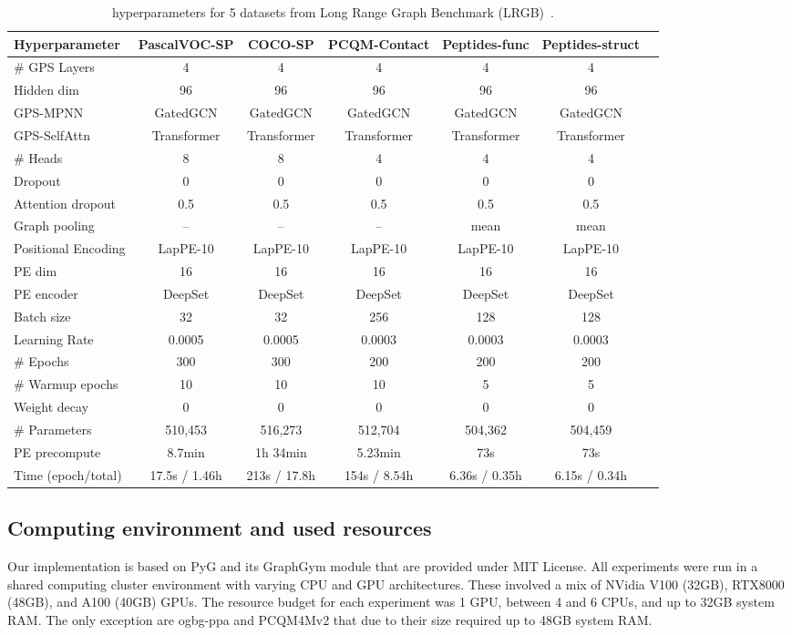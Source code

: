 \documentclass{article}
\begin{document}
\begin{table}[ht]
    \caption{\method hyperparameters for 5 datasets from Long Range Graph Benchmark (LRGB)~\cite{dwivedi2022LRGB}.}
    \label{tab:hparams_lrgb}
    \centering
\fontsize{8.5pt}{8.5pt}\selectfont
    \begin{tabular}{lcccccc}\toprule
    Hyperparameter &\textbf{PascalVOC-SP} &\textbf{COCO-SP} &\textbf{PCQM-Contact} &\textbf{Peptides-func} &\textbf{Peptides-struct} \\\midrule
    \# GPS Layers &4 &4 &4 &4 &4 \\
    Hidden dim &96 &96 &96 &96 &96 \\
    GPS-MPNN &GatedGCN &GatedGCN &GatedGCN &GatedGCN &GatedGCN \\
    GPS-SelfAttn &Transformer &Transformer &Transformer &Transformer &Transformer \\
    \# Heads &8 &8 &4 &4 &4 \\
    Dropout &0 &0 &0 &0 &0 \\
    Attention dropout &0.5 &0.5 &0.5 &0.5 &0.5 \\
    Graph pooling &-- &-- &-- &mean &mean \\\midrule
    Positional Encoding &LapPE-10 &LapPE-10 &LapPE-10 &LapPE-10 &LapPE-10 \\
    PE dim &16 &16 &16 &16 &16 \\
    PE encoder &DeepSet &DeepSet &DeepSet &DeepSet &DeepSet \\\midrule
    Batch size &32 &32 &256 &128 &128 \\
    Learning Rate &0.0005 &0.0005 &0.0003 &0.0003 &0.0003 \\
    \# Epochs &300 &300 &200 &200 &200 \\
    \# Warmup epochs &10 &10 &10 &5 &5 \\
    Weight decay &0 &0 &0 &0 &0 \\\midrule
    \# Parameters &510,453 &516,273 &512,704 &504,362 &504,459 \\
    PE precompute &8.7min &1h 34min &5.23min &73s &73s \\
    Time (epoch/total) &17.5s / 1.46h &213s / 17.8h &154s / 8.54h &6.36s / 0.35h &6.15s / 0.34h \\
    \bottomrule
    \end{tabular}
\end{table}


\subsection{Computing environment and used resources}\label{app:cluster}
Our implementation is based on PyG and its GraphGym module \cite{FeyLenssen2019PyG,you2020design} that are provided under MIT License. All experiments were run in a shared computing cluster environment with varying CPU and GPU architectures. These involved a mix of NVidia V100 (32GB), RTX8000 (48GB), and A100 (40GB) GPUs. The resource budget for each experiment was 1 GPU, between 4 and 6 CPUs, and up to 32GB system RAM. The only exception are ogbg-ppa and PCQM4Mv2 that due to their size required up to 48GB system RAM.
\end{document}

